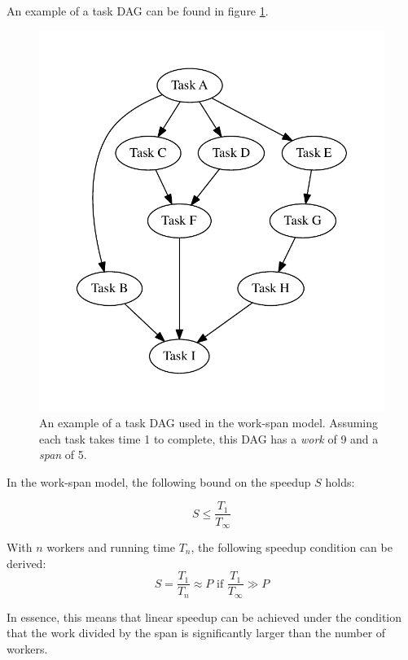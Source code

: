 An example of a task DAG can be found in figure \ref{fig:dag_example}.

\begin{figure}[ht]
  \centering
  \includegraphics[width=120mm]{figures/task_dag_example.pdf}
  \caption[Example of work-span model task DAG]{An example of a task DAG used in the work-span model. Assuming each task takes
    time 1 to complete, this DAG has a \textit{work} of 9 and a \textit{span} of 5.}
  \label{fig:dag_example}
\end{figure}

In the work-span model, the following bound on the speedup $S$ holds:

\begin{displaymath}
  S \leq \frac{T_1}{T_\infty}
\end{displaymath}

With $n$ workers and running time $T_n$, the following speedup condition can be derived:
\begin{displaymath}
  S = \frac{T_1}{T_n} \approx P \text{ if } \frac{T_1}{T_\infty} \gg P
\end{displaymath}

In essence, this means that linear speedup can be achieved under the condition that the work divided by the span is significantly
larger than the number of workers.

